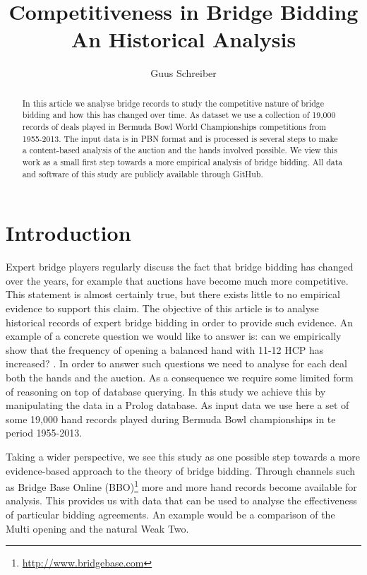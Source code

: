 \documentclass{llncs}
\title{Competitiveness in Bridge Bidding \\ An Historical Analysis}
\author{Guus Schreiber}
\institute{VU University Amsterdam, Computer Science \\
                E-mail: \instance{guus.schreiber@vu.nl}}
\begin{document}
\maketitle

\begin{abstract}
  In this article we analyse bridge records to study the competitive
  nature of bridge bidding and how this has changed over time.  As
  dataset we use a collection of 19,000 records of deals played in
  Bermuda Bowl World Championships competitions from 1955-2013.  The
  input data is in PBN format and is processed is several steps to
  make a content-based analysis of the auction and the hands involved
  possible.  We view this work as a small first step towards a more
  empirical analysis of bridge bidding.  All data and software of this
  study are publicly available through GitHub.
\end{abstract}

\section{Introduction}

Expert bridge players regularly discuss the fact that bridge bidding
has changed over the years, for example that auctions have become much
more competitive. This statement is almost certainly true, but there
exists little to no empirical evidence to support this claim. The
objective of this article is to analyse historical records of expert
bridge bidding in order to provide such evidence. An example of a
concrete question we would like to answer is: can we empirically show
that the frequency of opening a balanced hand with 11-12 HCP has
increased? . In order to answer such questions we need to analyse for
each deal both the hands and the auction. As a consequence we require
some limited form of reasoning on top of database querying.  In this
study we achieve this by manipulating the data in a Prolog database.
As input data we use here a set of some 19,000 hand records played
during Bermuda Bowl championships in te period 1955-2013.

Taking a wider perspective, we see this study as one possible step
towards a more evidence-based approach to the theory of bridge
bidding. Through channels such as Bridge Base Online
(BBO)\footnote{\url{http://www.bridgebase.com}} more and more hand
records become available for analysis. This provides us with data that
can be used to analyse the effectiveness of particular bidding
agreements. An example would be a comparison of the Multi opening and
the natural Weak Two.
\end{document}
